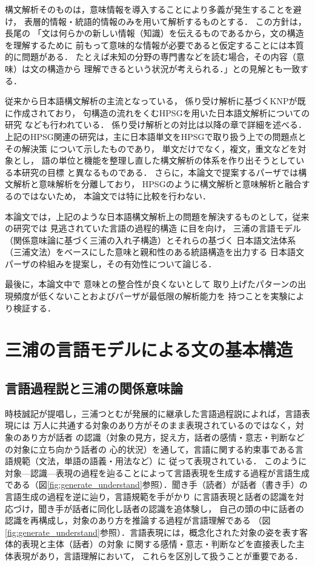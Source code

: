 \documentclass[japanese]{jnlp_1.2}
\begin{document}
構文解析そのものは，意味情報を導入することにより多義が発生することを避け，
表層的情報・統語的情報のみを用いて解析するものとする．
この方針は，長尾\cite{長尾1996}の
「文は何らかの新しい情報（知識）を伝えるものであるから，文の構造を理解するために
前もって意味的な情報が必要であると仮定することには本質的に問題がある．
たとえば未知の分野の専門書などを読む場合，その内容（意味）は文の構造から
理解できるという状況が考えられる．」との見解とも一致する．

従来から日本語構文解析の主流となっている，
係り受け解析に基づくKNP\cite{黒橋他1994}が既に作成されており，
句構造の流れをくむHPSGを用いた日本語文解析についての研究\cite{大谷他2000}
なども行われている．
係り受け解析との対比は以降の章で詳細を述べる．
上記のHPSG関連の研究は，主に日本語単文をHPSGで取り扱う上での問題点とその解決策
について示したものであり，
単文だけでなく，複文，重文などを対象とし，
語の単位と機能を整理し直した構文解析の体系を作り出そうとしている本研究の目標
と異なるものである．
さらに，本論文で提案するパーザでは構文解析と意味解析を分離しており，
HPSGのように構文解析と意味解析と融合するのではないため，
本論文では特に比較を行わない．

本論文では，上記のような日本語構文解析上の問題を解決するものとして，従来の研究では
見逃されていた言語の過程的構造
\cite{池原他1987,池原他1992,宮崎他1992}
に目を向け，
三浦の言語モデル（関係意味論に基づく三浦の入れ子構造）とそれらの基づく
日本語文法体系（三浦文法）をベースにした意味と親和性のある統語構造を出力する
日本語文パーザの枠組みを提案し，その有効性について論じる．

最後に，本論文中で
意味との整合性が良くないとして
取り上げたパターンの出現頻度が低くないことおよびパーザが最低限の解析能力を
持つことを実験により検証する．

\section{三浦の言語モデルによる文の基本構造}
\subsection{言語過程説と三浦の関係意味論}
時枝誠記が提唱し，三浦つとむが発展的に継承した言語過程説によれば，言語表現には
万人に共通する対象のあり方がそのまま表現されているのではなく，対象のあり方が話者
の認識（対象の見方，捉え方，話者の感情・意志・判断などの対象に立ち向かう話者の
心的状況）を通して，言語に関する約束事である言語規範（文法，単語の語義・用法など）に
従って表現されている．
このように対象—認識—表現の過程を辿ることによって言語表現を生成する過程が言語生成
である（図\ref{fig:generate_understand}参照）．聞き手（読者）が話者（書き手）の言語生成の過程を逆に辿り，言語規範を手がかり
に言語表現と話者の認識を対応づけ，聞き手が話者に同化し話者の認識を追体験し，
自己の頭の中に話者の認識を再構成し，対象のあり方を推論する過程が言語理解である
（図\ref{fig:generate_understand}参照）．言語表現には，概念化された対象の姿を表す客体的表現と主体（話者）の対象
に関する感情・意志・判断などを直接表した主体表現があり，言語理解において，
これらを区別して扱うことが重要である．
\end{document}
